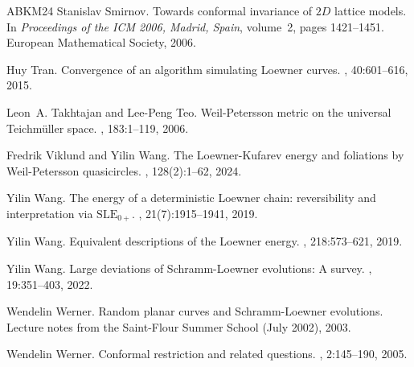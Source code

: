 \documentclass[a4paper, 11pt]{article}
\theoremstyle{definition}
\numberwithin{equation}{section}
\numberwithin{figure}{section}
\begin{document}
\begin{thebibliography}{ABKM24}
Stanislav Smirnov.
\newblock Towards conformal invariance of {$2D$} lattice models.
\newblock In {\em Proceedings of the ICM 2006, Madrid, Spain}, volume~2, pages
  1421--1451. European Mathematical Society, 2006.

Huy Tran.
\newblock Convergence of an algorithm simulating {L}oewner curves.
, 40:601--616, 2015.

Leon~A. Takhtajan and Lee-Peng Teo.
\newblock Weil-{P}etersson metric on the universal {T}eichm\"uller space.
, 183:1--119, 2006.

Fredrik Viklund and Yilin Wang.
\newblock The {L}oewner-{K}ufarev energy and foliations by {W}eil-{P}etersson
  quasicircles.
, 128(2):1--62, 2024.

Yilin Wang.
\newblock The energy of a deterministic {L}oewner chain: reversibility and
  interpretation via {$\mathrm{SLE}_{0+}$}.
, 21(7):1915--1941, 2019.

Yilin Wang.
\newblock Equivalent descriptions of the {L}oewner energy.
, 218:573--621, 2019.

Yilin Wang.
\newblock Large deviations of {S}chramm-{L}oewner evolutions: {A} survey.
, 19:351--403, 2022.

Wendelin Werner.
\newblock Random planar curves and {S}chramm-{L}oewner evolutions.
\newblock Lecture notes from the {S}aint-{F}lour {S}ummer {S}chool (July 2002),
  2003.

Wendelin Werner.
\newblock Conformal restriction and related questions.
, 2:145--190, 2005.

\end{thebibliography}
\end{document}
